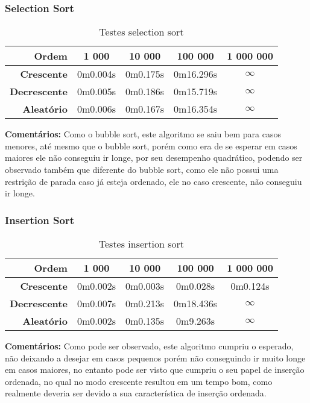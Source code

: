 \documentclass[
	12pt,				%
	oneside,			%
	a4paper,			%
	english,			%
	brazil,				%
	]{article}
\begin{document}
\subsubsection{Selection Sort}
\begin{table}[H]
\centering
\begin{tabular}{|r|c|c|c|c|}
\cline{1-5} 
 \textbf{Ordem} & \textbf{1 000} & \textbf{10 000} & \textbf{100 000} & \textbf{1 000 000}\\
 \hline
 \textbf{Crescente} & 0m0.004s & 0m0.175s & 0m16.296s & $\infty$ \\
 \hline
 \textbf{Decrescente} & 0m0.005s & 0m0.186s & 0m15.719s & $\infty$ \\
 \hline
 \textbf{Aleat{\'o}rio} & 0m0.006s & 0m0.167s & 0m16.354s & $\infty$ \\
 \hline
\end{tabular} 
\caption{Testes selection sort}
\end{table}
\indent \textbf{Comentários:} Como o bubble sort, este algoritmo se saiu bem para casos menores, até mesmo que o bubble sort, porém como era de se esperar em casos maiores
ele não conseguiu ir longe, por seu desempenho quadrático, podendo ser observado também que diferente do bubble sort, como ele não possui uma restrição de parada caso
já esteja ordenado, ele no caso crescente, não conseguiu ir longe.


\subsubsection{Insertion Sort}
\begin{table}[H]
\centering
\begin{tabular}{|r|c|c|c|c|}
\cline{1-5} 
 \textbf{Ordem} & \textbf{1 000} & \textbf{10 000} & \textbf{100 000} & \textbf{1 000 000}\\
 \hline
 \textbf{Crescente} & 0m0.002s & 0m0.003s & 0m0.028s & 0m0.124s \\
 \hline
 \textbf{Decrescente} & 0m0.007s & 0m0.213s & 0m18.436s & $\infty$ \\
 \hline
 \textbf{Aleat{\'o}rio} & 0m0.002s & 0m0.135s & 0m9.263s & $\infty$ \\
 \hline
\end{tabular} 
\caption{Testes insertion sort}
\end{table}
\indent \textbf{Comentários:} Como pode ser observado, este algoritmo cumpriu o esperado, não deixando a desejar em casos pequenos porém não conseguindo ir muito longe em
casos maiores, no entanto pode ser visto que cumpriu o seu papel de inserção ordenada, no qual no modo crescente resultou em um tempo bom, como realmente deveria ser
devido a sua característica de inserção ordenada.
\end{document}
